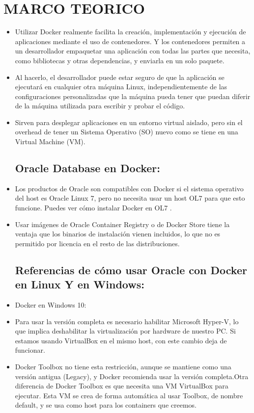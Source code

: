 \section{MARCO TEORICO} 

\begin{itemize}
\subsection{Docker:}
	\item Utilizar Docker realmente facilita la creación, implementación y ejecución de aplicaciones mediante el uso de contenedores. Y los contenedores permiten a un desarrollador empaquetar una aplicación con todas las partes que necesita, como bibliotecas y otras dependencias, y enviarla en un solo paquete. 
          \item Al hacerlo, el desarrollador puede estar seguro de que la aplicación se ejecutará en cualquier otra máquina Linux, independientemente de las configuraciones personalizadas que la máquina pueda tener que puedan diferir de la máquina utilizada para escribir y probar el código.
         \item Sirven para desplegar aplicaciones en un entorno virtual aislado, pero sin el overhead de tener un Sistema Operativo (SO) nuevo como se tiene en una Virtual Machine (VM).

\subsection{Oracle Database en Docker:}
	\item Los productos de Oracle son compatibles con Docker si el sistema operativo del host es Oracle Linux 7, pero no necesita usar un host OL7 para que esto funcione. Puedes ver cómo instalar Docker en OL7 .
	\item Usar imágenes de Oracle Container Registry o de Docker Store tiene la ventaja que los binarios de instalación vienen incluidos, lo que no es permitido por licencia en el resto de las distribuciones. 
\subsection{Referencias de cómo usar Oracle con Docker en Linux Y  en Windows:}
	\item Docker en Windows 10:
	\item Para usar la versión completa es necesario habilitar Microsoft Hyper-V, lo que implica deshabilitar la virtualización por hardware de nuestro PC. Si estamos usando VirtualBox en el mismo host, con este cambio deja de funcionar.
           \item Docker Toolbox no tiene esta restricción, aunque se mantiene como una versión antigua (Legacy), y Docker recomienda usar la versión completa.Otra diferencia de Docker Toolbox es que necesita una VM VirtualBox para ejecutar. Esta VM se crea de forma automática al usar Toolbox, de nombre default, y se usa como host para los containers que creemos.

\end{itemize}
